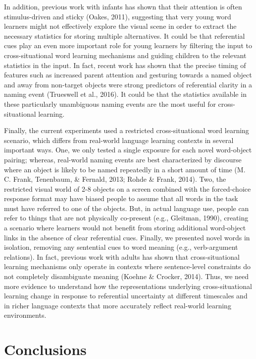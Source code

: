 \documentclass[oneside]{report}
\begin{document}
In addition, previous work with infants has shown that their attention
is often stimulus-driven and sticky (Oakes, 2011), suggesting that very
young word learners might not effectively explore the visual scene in
order to extract the necessary statistics for storing multiple
alternatives. It could be that referential cues play an even more
important role for young learners by filtering the input to
cross-situational word learning mechanisms and guiding children to the
relevant statistics in the input. In fact, recent work has shown that
the precise timing of features such as increased parent attention and
gesturing towards a named object and away from non-target objects were
strong predictors of referential clarity in a naming event (Trueswell et
al., 2016). It could be that the statistics available in these
particularly unambiguous naming events are the most useful for
cross-situational learning.

Finally, the current experiments used a restricted cross-situational
word learning scenario, which differs from real-world language learning
contexts in several important ways. One, we only tested a single
exposure for each novel word-object pairing; whereas, real-world naming
events are best characterized by discourse where an object is likely to
be named repeatedly in a short amount of time (M. C. Frank, Tenenbaum,
\& Fernald, 2013; Rohde \& Frank, 2014). Two, the restricted visual
world of 2-8 objects on a screen combined with the forced-choice
response format may have biased people to assume that all words in the
task must have referred to one of the objects. But, in actual language
use, people can refer to things that are not physically co-present
(e.g., Gleitman, 1990), creating a scenario where learners would not
benefit from storing additional word-object links in the absence of
clear referential cues. Finally, we presented novel words in isolation,
removing any sentential cues to word meaning (e.g., verb-argument
relations). In fact, previous work with adults has shown that
cross-situational learning mechanisms only operate in contexts where
sentence-level constraints do not completely disambiguate meaning
(Koehne \& Crocker, 2014). Thus, we need more evidence to understand how
the representations underlying cross-situational learning change in
response to referential uncertainty at different timescales and in
richer language contexts that more accurately reflect real-world
learning environments.

\section{Conclusions}\label{conclusions}
\end{document}
